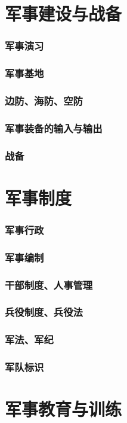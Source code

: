 \documentclass[UTF8]{../ApplicationUniverse}
\begin{document}
\section{军事建设与战备}
    \subsubsection{军事演习}
    \subsubsection{军事基地}
    \subsubsection{边防、海防、空防}
    \subsubsection{军事装备的输入与输出}
    \subsubsection{战备}
\section{军事制度}
    \subsubsection{军事行政}
    \subsubsection{军事编制}
    \subsubsection{干部制度、人事管理}
    \subsubsection{兵役制度、兵役法}
    \subsubsection{军法、军纪}
    \subsubsection{军队标识}
\section{军事教育与训练}
\end{document}
